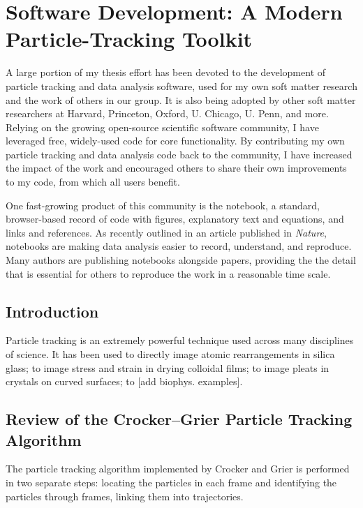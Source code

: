 \chapter{Software Development: A Modern Particle-Tracking Toolkit}

A large portion of my thesis effort has been devoted to the development of particle tracking and data analysis software, used for my own soft matter research and the work of others in our group. It is also being adopted by other soft matter researchers at Harvard, Princeton, Oxford, U. Chicago, U. Penn, and more. Relying on the growing open-source scientific software community, I have leveraged free, widely-used code for core functionality. By contributing my own particle tracking and data analysis code back to the community, I have increased the impact of the work and encouraged others to share their own improvements to my code, from which all users benefit.

One fast-growing product of this community is the notebook, a standard, browser-based record of code with figures, explanatory text and equations, and links and references. As recently outlined in an article published in \emph{Nature}\cite{Shen2014}, notebooks are making data analysis easier to record, understand, and reproduce. Many authors are publishing notebooks alongside papers, providing the the detail that is essential for others to reproduce the work in a reasonable time scale.

\section{Introduction}

Particle tracking is an extremely powerful technique used across many disciplines of science. It has been used to directly image atomic rearrangements in silica glass\cite{Huang2013a}; to image stress and strain in drying colloidal films\cite{Xu2013a}; to image pleats in crystals on curved surfaces\cite{Irvine2010}; to [add biophys. examples].

\section{Review of the Crocker--Grier Particle Tracking Algorithm}

The particle tracking algorithm implemented by Crocker and Grier is performed in two separate steps: locating the particles in each frame and identifying the particles through frames, linking them into trajectories.

